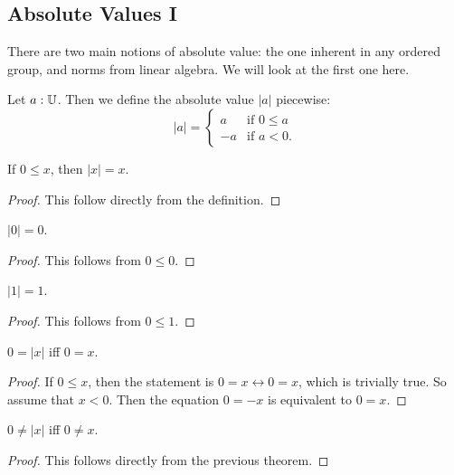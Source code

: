 \documentclass[../math.tex]{subfiles}
\begin{document}
\subsection{Absolute Values I}

There are two main notions of absolute value: the one inherent in any ordered
group, and norms from linear algebra.  We will look at the first one here.

\begin{definition}
    Let $a : \mathbb{U}$.  Then we define the absolute value $|a|$ piecewise:
    \[
        |a| = \begin{cases}
            a & \text{if $0 \leq a$} \\
            -a & \text{if $a < 0$.}
        \end{cases}
    \]
\end{definition}

\begin{theorem} \label{abs_pos_eq}
    If $0 \leq x$, then $|x| = x$.
\end{theorem}
\begin{proof}
    This follow directly from the definition.
\end{proof}

\begin{theorem}
    $|0| = 0$.
\end{theorem}
\begin{proof}
    This follows from $0 \leq 0$.
\end{proof}

\begin{theorem}
    $|1| = 1$.
\end{theorem}
\begin{proof}
    This follows from $0 \leq 1$.
\end{proof}

\begin{theorem}
    $0 = |x|$ iff $0 = x$.
\end{theorem}
\begin{proof}
    If $0 \leq x$, then the statement is $0 = x \leftrightarrow 0 = x$, which is
    trivially true.  So assume that $x < 0$.  Then the equation $0 = -x$ is
    equivalent to $0 = x$.
\end{proof}

\begin{theorem}
    $0 \neq |x|$ iff $0 \neq x$.
\end{theorem}
\begin{proof}
    This follows directly from the previous theorem.
\end{proof}
\end{document}
